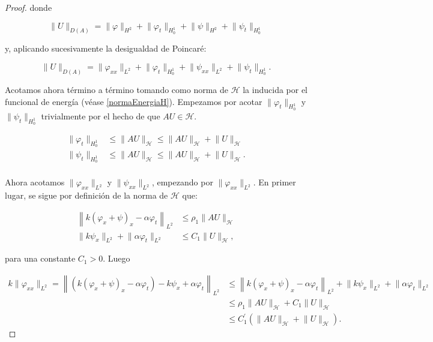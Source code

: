 \begin{proof}
    donde 

    \[\lVert U \rVert_{D(A)} = \lVert \varphi \rVert_{H^2} + \lVert \varphi_t \rVert_{H_0^1} + \lVert \psi \rVert_{H^2} + \lVert \psi_t \rVert_{H_0^1}\]

    y, aplicando sucesivamente la desigualdad de Poincaré:

    \[\lVert U \rVert_{D(A)} = \lVert \varphi_{xx} \rVert_{L^2} + \lVert \varphi_t \rVert_{H_0^1} + \lVert \psi_{xx} \rVert_{L^2} + \lVert \psi_t \rVert_{H_0^1}.\]
    
    Acotamos ahora término a término tomando como norma de $\mathcal{H}$ la inducida por el funcional de energía (véase \ref{normaEnergiaH}). Empezamos por acotar $\lVert \varphi_t \rVert_{H_0^1}$ y $\lVert \psi_t \rVert_{H_0^1}$ trivialmente por el hecho de que $AU \in \mathcal{H}$.
    
    \begin{align*}
        \lVert \varphi_t \rVert_{H_0^1} &\leq \lVert AU \rVert_{\mathcal{H}} \leq \lVert AU \rVert_{\mathcal{H}} + \lVert U \rVert_{\mathcal{H}}\\
        \lVert \psi_t \rVert_{H_0^1} &\leq \lVert AU \rVert_{\mathcal{H}} \leq \lVert AU \rVert_{\mathcal{H}} + \lVert U \rVert_{\mathcal{H}}.\\
    \end{align*}

    Ahora acotamos $\lVert \varphi_{xx} \rVert_{L^2}$ y $\lVert \psi_{xx} \rVert_{L^2}$, empezando por $\lVert \varphi_{xx} \rVert_{L^2}$. En primer lugar, se sigue por definición de la norma de $\mathcal{H}$ que:

    \begin{align*}
        \left \lVert k(\varphi_x + \psi)_x - \alpha\varphi_t \right \rVert_{L^2} &\leq \rho_1\lVert AU \rVert_{\mathcal{H}}\\
        \lVert k\psi_x\rVert_{L^2} + \lVert\alpha \varphi_t \rVert_{L^2} &\leq C_1\lVert U \rVert_{\mathcal{H}},
    \end{align*}

    para una constante $C_1 > 0$. Luego

    \begin{align*}
        k\lVert \varphi_{xx} \rVert_{L^2} = \left\lVert \left( k(\varphi_x + \psi)_x - \alpha\varphi_t \right) - k\psi_x + \alpha \varphi_t \right\rVert_{L^2} &\leq \left \lVert k(\varphi_x + \psi)_x - \alpha\varphi_t \right \rVert_{L^2} + \lVert k\psi_x\rVert_{L^2} + \lVert\alpha \varphi_t \rVert_{L^2}\\
        &\leq \rho_1\lVert AU \rVert_{\mathcal{H}} + C_1\lVert U \rVert_{\mathcal{H}}\\
        &\leq C_1^\prime(\lVert AU \rVert_{\mathcal{H}} + \lVert U \rVert_{\mathcal{H}}).
    \end{align*}


\end{proof}
